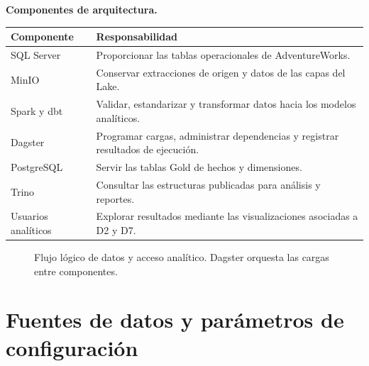 \documentclass[10pt,a4paper]{article}
\begin{document}
\textbf{Componentes de arquitectura.}
\small
\begin{longtable}{p{}p{}}
\toprule
\textbf{Componente} & \textbf{Responsabilidad}\\
\midrule
\endhead
SQL Server & Proporcionar las tablas operacionales de AdventureWorks.\\
MinIO & Conservar extracciones de origen y datos de las capas del Lake.\\
Spark y dbt & Validar, estandarizar y transformar datos hacia los modelos
analíticos.\\
Dagster & Programar cargas, administrar dependencias y registrar resultados
de ejecución.\\
PostgreSQL & Servir las tablas Gold de hechos y dimensiones.\\
Trino & Consultar las estructuras publicadas para análisis y reportes.\\
Usuarios analíticos & Explorar resultados mediante las visualizaciones
asociadas a D2 y D7.\\
\bottomrule
\end{longtable}
\normalsize

\begin{figure}[htbp]
\centering
{}
\caption{Flujo lógico de datos y acceso analítico. Dagster orquesta las cargas
entre componentes.}
\end{figure}

\section{Fuentes de datos y parámetros de configuración}
\end{document}

